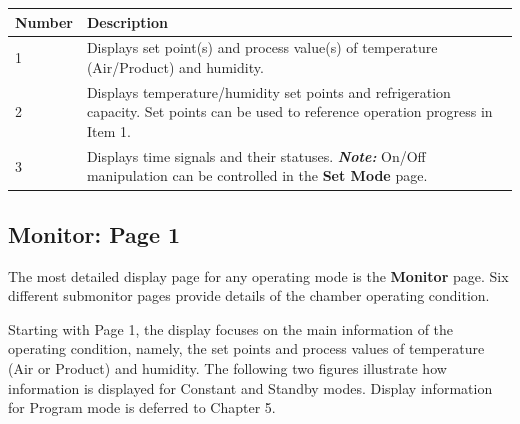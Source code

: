 \begin{longtable}[]{@{}ll@{}}
\toprule
\begin{minipage}[b]{0.07\columnwidth}\raggedright
Number\strut
\end{minipage} & \begin{minipage}[b]{0.88\columnwidth}\raggedright
Description\strut
\end{minipage}\tabularnewline
\midrule
\endhead
\begin{minipage}[t]{0.07\columnwidth}\raggedright
1\strut
\end{minipage} & \begin{minipage}[t]{0.88\columnwidth}\raggedright
Displays set point(s) and process value(s) of temperature (Air/Product)
and humidity.\strut
\end{minipage}\tabularnewline
\begin{minipage}[t]{0.07\columnwidth}\raggedright
2\strut
\end{minipage} & \begin{minipage}[t]{0.88\columnwidth}\raggedright
Displays temperature/humidity set points and refrigeration capacity. Set
points can be used to reference operation progress in Item 1.\strut
\end{minipage}\tabularnewline
\begin{minipage}[t]{0.07\columnwidth}\raggedright
3\strut
\end{minipage} & \begin{minipage}[t]{0.88\columnwidth}\raggedright
Displays time signals and their statuses. \textbf{\emph{Note:}} On/Off
manipulation can be controlled in the \textbf{Set Mode} page.\strut
\end{minipage}\tabularnewline
\bottomrule
\end{longtable}


\subsection{Monitor: Page 1}

The most detailed display page for any operating mode is the
\textbf{Monitor} page. Six different submonitor pages provide details of
the chamber operating condition.

Starting with Page 1, the display focuses on the main information of the
operating condition, namely, the set points and process values of
temperature (Air or Product) and humidity. The following two figures
illustrate how information is displayed for Constant and Standby modes.
Display information for Program mode is deferred to Chapter 5.

